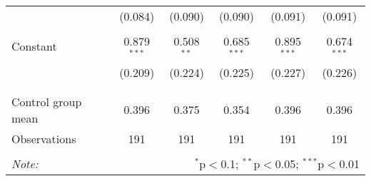 \begin{tabular}{@{\extracolsep{5pt}}lccccc}
  & (0.084) & (0.090) & (0.090) & (0.091) & (0.091) \\ 
  & & & & & \\ 
 Constant & 0.879$^{***}$ & 0.508$^{**}$ & 0.685$^{***}$ & 0.895$^{***}$ & 0.674$^{***}$ \\ 
  & (0.209) & (0.224) & (0.225) & (0.227) & (0.226) \\ 
  & & & & & \\ 
\hline \\[-1.8ex] 
Control group mean & 0.396 & 0.375 & 0.354 & 0.396 & 0.396 \\ 
Observations & 191 & 191 & 191 & 191 & 191 \\ 
\hline 
\hline \\[-1.8ex] 
\textit{Note:}  & \multicolumn{5}{r}{$^{*}$p$<$0.1; $^{**}$p$<$0.05; $^{***}$p$<$0.01} \\ 
\end{tabular} 
